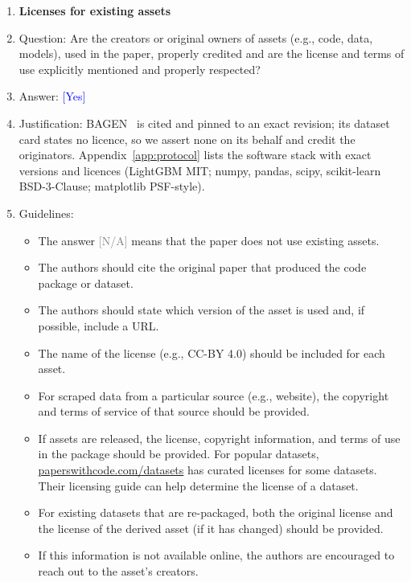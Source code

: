 \documentclass{article}
\providecommand{\answerYes}[1][]{\textcolor{blue}{[Yes] #1}}
\providecommand{\answerNA}[1][]{\textcolor{gray}{[N/A] #1}}
\begin{document}
\begin{enumerate}
\item {\bf Licenses for existing assets}
    \item[] Question: Are the creators or original owners of assets (e.g., code, data, models), used in the paper, properly credited and are the license and terms of use explicitly mentioned and properly respected?
    \item[] Answer: \answerYes{}
    \item[] Justification: BAGEN~\citep{lin2026bagen} is cited and pinned to an exact revision; its dataset card states no licence, so we assert none on its behalf and credit the originators. Appendix~\ref{app:protocol} lists the software stack with exact versions and licences (LightGBM MIT; numpy, pandas, scipy, scikit-learn BSD-3-Clause; matplotlib PSF-style).
    \item[] Guidelines:
    \begin{itemize}
        \item The answer \answerNA{} means that the paper does not use existing assets.
        \item The authors should cite the original paper that produced the code package or dataset.
        \item The authors should state which version of the asset is used and, if possible, include a URL.
        \item The name of the license (e.g., CC-BY 4.0) should be included for each asset.
        \item For scraped data from a particular source (e.g., website), the copyright and terms of service of that source should be provided.
        \item If assets are released, the license, copyright information, and terms of use in the package should be provided. For popular datasets, \url{paperswithcode.com/datasets} has curated licenses for some datasets. Their licensing guide can help determine the license of a dataset.
        \item For existing datasets that are re-packaged, both the original license and the license of the derived asset (if it has changed) should be provided.
        \item If this information is not available online, the authors are encouraged to reach out to the asset's creators.
    \end{itemize}


\end{enumerate}
\end{document}
